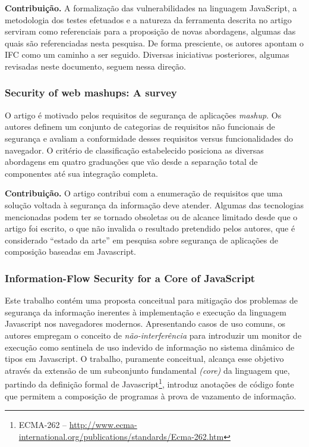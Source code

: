 \textbf{Contribuição.} A formalização das vulnerabilidades na linguagem JavaScript, a metodologia dos testes efetuados e a natureza da ferramenta descrita no artigo serviram como referenciais para a proposição de novas abordagens, algumas das quais são referenciadas nesta pesquisa. De forma presciente, os autores apontam o IFC como um caminho a ser seguido. Diversas iniciativas posteriores, algumas revisadas neste documento, seguem nessa direção.


\subsubsection{Security of web mashups: A survey \cite{DeRyck2012}}
O artigo é motivado pelos requisitos de segurança de aplicações \textit{mashup}. Os autores definem um conjunto de categorias de requisitos não funcionais de segurança e avaliam a conformidade desses requisitos versus funcionalidades do navegador. O critério de classificação estabelecido posiciona as diversas abordagens em quatro graduações que vão desde a separação total de componentes até sua integração completa.

\textbf{Contribuição.} O artigo contribui com a enumeração de requisitos que uma solução voltada à segurança da informação deve atender. Algumas das tecnologias mencionadas podem ter se tornado obsoletas ou de alcance limitado desde que o artigo foi escrito, o que não invalida o resultado pretendido pelos autores, que é considerado ``estado da arte'' \cite{Hedin2014} em pesquisa sobre segurança de aplicações de composição baseadas em Javascript.


\subsubsection{Information-Flow Security for a Core of JavaScript \cite{Hedin2012}}
Este trabalho contém uma proposta conceitual para mitigação dos problemas de segurança da informação inerentes à implementação e execução da linguagem Javascript nos navegadores modernos. Apresentando casos de uso comuns, os autores empregam o conceito de \textit{não-interferência} para introduzir um monitor de execução como sentinela de uso indevido de informação no sistema dinâmico de tipos em Javascript. O trabalho, puramente conceitual, alcança esse objetivo através da extensão de um subconjunto fundamental \textit{(core)} da linguagem que, partindo da definição formal de Javascript\footnote{ECMA-262 -- \url{http://www.ecma-international.org/publications/standards/Ecma-262.htm}}, introduz anotações de código fonte que permitem a composição de programas à prova de vazamento de informação.

